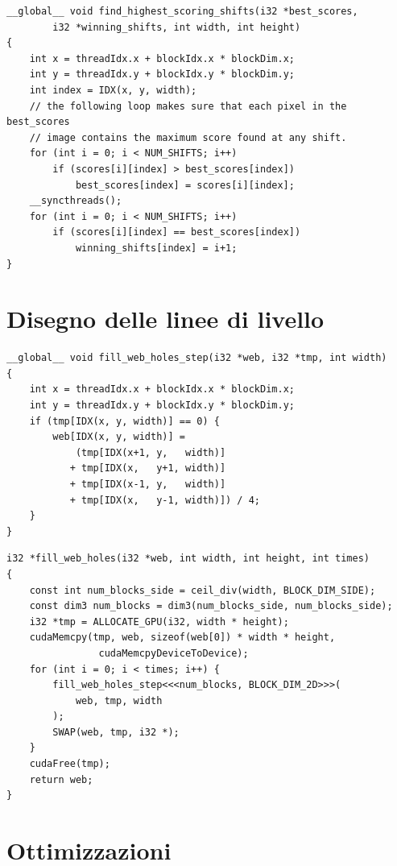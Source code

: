 \documentclass[12pt,a4paper,openright,twoside]{report}
\begin{document}
\begin{lstlisting}[style=mystyle]
__global__ void find_highest_scoring_shifts(i32 *best_scores,
        i32 *winning_shifts, int width, int height)
{
    int x = threadIdx.x + blockIdx.x * blockDim.x;
    int y = threadIdx.y + blockIdx.y * blockDim.y;
    int index = IDX(x, y, width);
    // the following loop makes sure that each pixel in the best_scores
    // image contains the maximum score found at any shift.
    for (int i = 0; i < NUM_SHIFTS; i++)
        if (scores[i][index] > best_scores[index])
            best_scores[index] = scores[i][index];
    __syncthreads();
    for (int i = 0; i < NUM_SHIFTS; i++)
        if (scores[i][index] == best_scores[index])
            winning_shifts[index] = i+1;
}
\end{lstlisting}

\section{Disegno delle linee di livello}

\begin{lstlisting}[style=mystyle]
__global__ void fill_web_holes_step(i32 *web, i32 *tmp, int width)
{
    int x = threadIdx.x + blockIdx.x * blockDim.x;
    int y = threadIdx.y + blockIdx.y * blockDim.y;
    if (tmp[IDX(x, y, width)] == 0) {
        web[IDX(x, y, width)] =
            (tmp[IDX(x+1, y,   width)]
           + tmp[IDX(x,   y+1, width)]
           + tmp[IDX(x-1, y,   width)]
           + tmp[IDX(x,   y-1, width)]) / 4;
    }
}
\end{lstlisting}

\begin{lstlisting}[style=mystyle]
i32 *fill_web_holes(i32 *web, int width, int height, int times)
{
    const int num_blocks_side = ceil_div(width, BLOCK_DIM_SIDE);
    const dim3 num_blocks = dim3(num_blocks_side, num_blocks_side);
    i32 *tmp = ALLOCATE_GPU(i32, width * height);
    cudaMemcpy(tmp, web, sizeof(web[0]) * width * height,
                cudaMemcpyDeviceToDevice);
    for (int i = 0; i < times; i++) {
        fill_web_holes_step<<<num_blocks, BLOCK_DIM_2D>>>(
            web, tmp, width
        );
        SWAP(web, tmp, i32 *);
    }
    cudaFree(tmp);
    return web;
}
\end{lstlisting}

\section{Ottimizzazioni}
\end{document}
